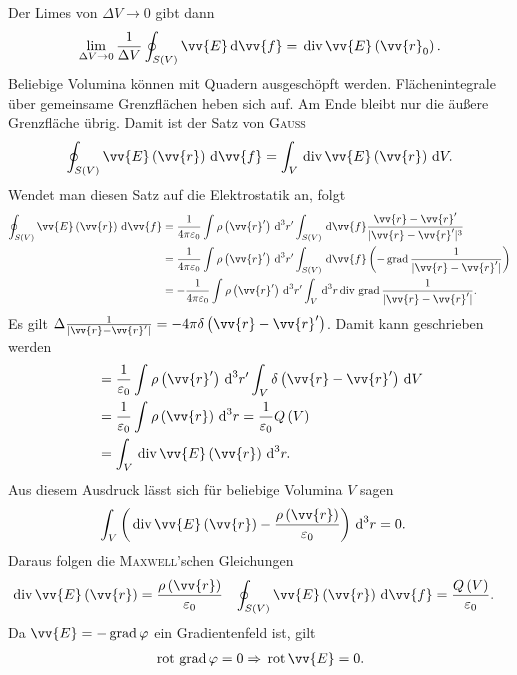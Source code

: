 \documentclass[a4paper,12pt]{article}
\newcommand{\td}{\,\text{d}}
\numberwithin{equation}{section}
\begin{document}
Der Limes von $\Delta V\rightarrow 0$ gibt dann
\begin{align} 
        \lim_{\Delta V\rightarrow 0}\dfrac{1}{\Delta V}\oint_{S\left(V\right)}^{}\vv{E}\td \vv{f}=\,\text{div}\,\vv{E}\left(\vv{r}_0\right)
.\end{align} 
Beliebige Volumina können mit Quadern ausgeschöpft werden. Flächenintegrale über gemeinsame Grenzflächen heben sich auf. Am Ende bleibt nur die äußere Grenzfläche übrig. Damit ist der Satz von \textsc{Gauss}
\begin{align} 
        \oint_{S\left(V\right)}^{}\vv{E}\left(\vv{r}\right)\td \vv{f}=\int_{V}^{}\,\text{div}\,\vv{E}\left(\vv{r}\right)\td V
.\end{align} 
Wendet man diesen Satz auf die Elektrostatik an, folgt
\begin{align} 
        \oint_{S\left(V\right)}^{}\vv{E}\left(\vv{r}\right)\td \vv{f}&=\dfrac{1}{4\pi \varepsilon _0}\int_{}^{}\rho \left(\vv{r}'\right)\td ^3r'\int_{S\left(V\right)}^{}\td \vv{f}\dfrac{\vv{r}-\vv{r}'}{|\vv{r}-\vv{r}'|^3}\\
                                                                     &=\dfrac{1}{4\pi \varepsilon _0}\int_{}^{}\rho \left(\vv{r}'\right)\td ^3r'\int_{S\left(V\right)}^{}\td \vv{f}\left(-\,\text{grad}\,\dfrac{1}{|\vv{r}-\vv{r}'|}\right)\\
                                                                     &=-\dfrac{1}{4\pi \varepsilon _0}\int_{}^{}\rho \left(\vv{r}'\right)\td ^3r'\int_{V}^{}\td ^3r\,\text{div}\,\,\text{grad}\,\dfrac{1}{|\vv{r}-\vv{r}'|}
.\end{align}
Es gilt $\Delta \tfrac{1}{|\vv{r}-\vv{r}'|}=-4\pi \delta \left(\vv{r}-\vv{r}'\right)$. Damit kann geschrieben werden
\begin{align} 
        &=\dfrac{1}{\varepsilon _0}\int_{}^{}\rho \left(\vv{r}'\right)\td ^3r'\int_{V}^{}\delta \left(\vv{r}-\vv{r}'\right)\td V\\
        &=\dfrac{1}{\varepsilon _0}\int_{}^{}\rho \left(\vv{r}\right)\td ^3r=\dfrac{1}{\varepsilon _0}Q\left(V\right)\\
        &=\int_{V}^{}\,\text{div}\,\vv{E}\left(\vv{r}\right)\td ^3r
.\end{align} 
Aus diesem Ausdruck lässt sich für beliebige Volumina $V$ sagen
\begin{align} 
        \int_{V}^{}\left(\,\text{div}\,\vv{E}\left(\vv{r}\right)-\dfrac{\rho \left(\vv{r}\right)}{\varepsilon _0}\right)\td ^3r&=0
.\end{align}
Daraus folgen die \textsc{Maxwell}'schen Gleichungen
\begin{align} 
        \,\text{div}\,\vv{E}\left(\vv{r}\right)&=\dfrac{\rho \left(\vv{r}\right)}{\varepsilon _0}&\oint_{S\left(V\right)}^{}\vv{E}\left(\vv{r}\right)\td \vv{f}&=\dfrac{Q\left(V\right)}{\varepsilon _0}
.\end{align} 
Da $\vv{E}=-\,\text{grad}\,\varphi $ ein Gradientenfeld ist, gilt
\begin{align} 
        \,\text{rot}\,\,\text{grad}\,\varphi =0\Rightarrow \,\text{rot}\,\vv{E}=0
.\end{align} 
\end{document}
